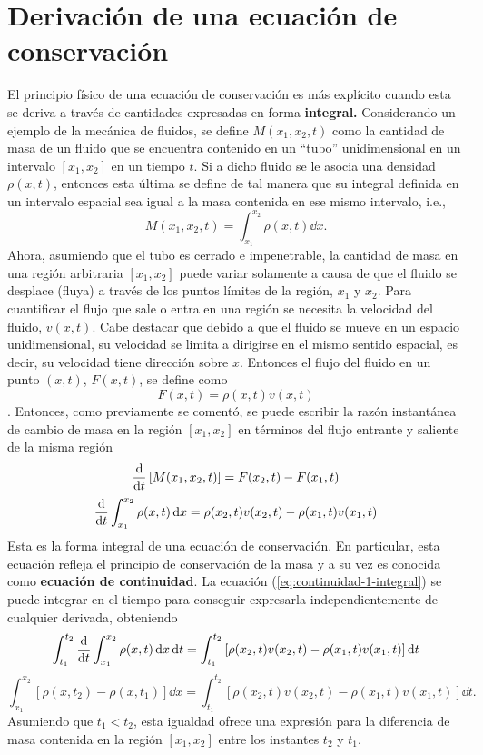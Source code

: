 \section{Derivación de una ecuación de conservación}
El principio físico de una ecuación de conservación es más explícito cuando esta se deriva a través de cantidades expresadas en forma \textbf{integral.} Considerando un ejemplo de la mecánica de fluidos, se define $M(x_1,x_2,t)$ como la cantidad de masa de un fluido que se encuentra contenido en un ``tubo'' unidimensional en un intervalo  $[x_1,x_2]$ en un tiempo $t$. Si a dicho fluido se le asocia una densidad $\rho(x,t)$, entonces esta última se define de tal manera que su integral definida en un intervalo espacial sea igual a la masa contenida en ese mismo intervalo, i.e.,
\begin{equation}
	M(x_1, x_2, t) = \int_{x_1}^{x_2}\rho(x,t)\dd{x}.
\end{equation}
Ahora, asumiendo que el tubo es cerrado e impenetrable, la cantidad de masa en una región arbitraria $[x_1,x_2]$ puede variar solamente a causa de que el fluido se desplace (fluya) a través de los puntos límites de la región, $x_1$ y $x_2$. Para cuantificar el flujo que sale o entra en una región se necesita la velocidad del fluido, $v(x,t)$. Cabe destacar que debido a que el fluido se mueve en un espacio unidimensional, su velocidad se limita a dirigirse en el mismo sentido espacial, es decir, su velocidad tiene dirección sobre $x$. Entonces el flujo del fluido en un punto $(x,t)$, $F(x,t)$, se define como 
\begin{equation}
	F(x,t) = \rho(x,t)v(x,t)
\end{equation}.
Entonces, como previamente se comentó, se puede escribir la razón instantánea de cambio de masa en la región $[x_1,x_2]$ en términos del flujo entrante y saliente de la misma región
\begin{equation}
	\dv{t}	\left[M(x_1, x_2, t)\right] = F(x_2,t) - F(x_1,t)
\end{equation}
\begin{equation}
	\dv{t}	\int_{x_1}^{x_2}\rho(x,t)\dd{x} = \rho(x_2,t)v(x_2,t) - \rho(x_1,t)v(x_1,t)
	\label{eq:continuidad-1-integral}
\end{equation}
Esta es la forma integral de una ecuación de conservación. En particular, esta ecuación refleja el principio de conservación de la masa y a su vez es conocida como \textbf{ecuación de continuidad}. La ecuación (\ref{eq:continuidad-1-integral}) se puede integrar en el tiempo para conseguir expresarla independientemente de cualquier derivada, obteniendo
\begin{equation}
	\int_{t_1}^{t_2}\dv{t}\int_{x_1}^{x_2}\rho(x,t)\dd{x}\dd{t}  = \int_{t_1}^{t_2}\left[\rho(x_2,t)v(x_2,t) - \rho(x_1,t)v(x_1,t)\right]\dd{t}
\end{equation}
\begin{equation}
	\int_{x_1}^{x_2}[\rho(x,t_2) - \rho(x,t_1)]\dd{x}  = \int_{t_1}^{t_2}\left[\rho(x_2,t)v(x_2,t) - \rho(x_1,t)v(x_1,t)\right]\dd{t} 
	\label{eq:continuidad-2-integral}.
\end{equation}
Asumiendo que $t_1<t_2$, esta igualdad ofrece una expresión para la diferencia de masa contenida en la región $[x_1,x_2]$ entre los instantes $t_2$ y $t_1$. 

